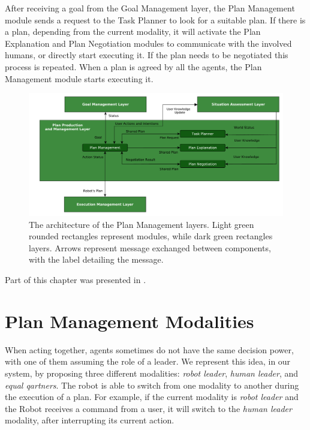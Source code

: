 After receiving a goal from the Goal Management layer, the Plan Management module sends a request to the Task Planner to look for a suitable plan. If there is a plan, depending from the current modality, it will activate the Plan Explanation and Plan Negotiation modules to communicate with the involved humans, or directly start executing it. If the plan needs to be negotiated this process is repeated. When a plan is agreed by all the agents, the Plan Management module starts executing it. 

\begin{figure}[ht!]
	\centering
	\includegraphics[scale=0.5]{img/plan_management/architecture.pdf}
	\caption[The architecture of the Plan Management layer]{The architecture of the Plan Management layers. Light green rounded rectangles represent modules, while dark green rectangles layers. Arrows represent message exchanged between components, with the label detailing the message.}
	\label{fig:plan_management-architecture}
\end{figure}


Part of this chapter was presented in \cite{Lallement2014,milliez2016using,fioreiser2014}.

\section{Plan Management Modalities}
\label{sec:plan_management-modalities}
When acting together, agents sometimes do not have the same decision power, with one of them assuming the role of a leader. We represent this idea, in our system, by proposing three different modalities: \textit{robot leader}, \textit{human leader}, and \textit{equal qartners}. The robot is able to switch from one modality to another during the execution of a plan. For example, if the current modality is \textit{robot leader} and the Robot receives a command from a user, it will switch to the \textit{human leader} modality, after interrupting its current action.

